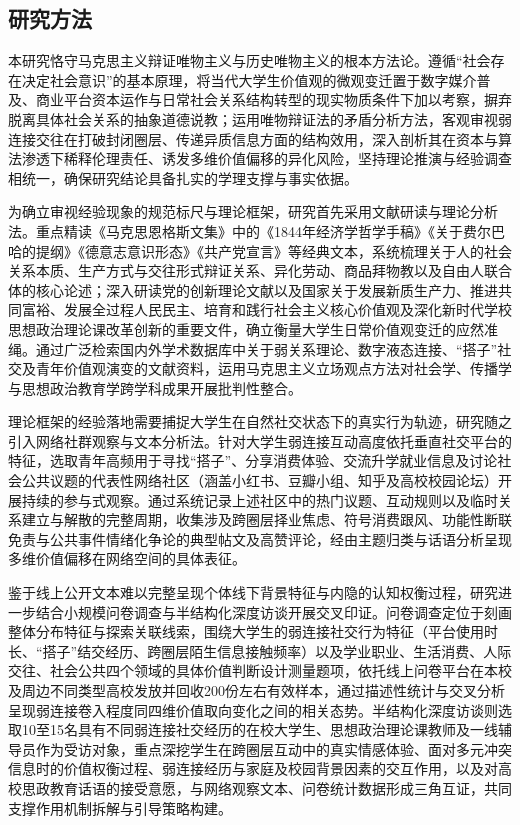 \subsection{研究方法}

本研究恪守马克思主义辩证唯物主义与历史唯物主义的根本方法论。遵循“社会存在决定社会意识”的基本原理，将当代大学生价值观的微观变迁置于数字媒介普及、商业平台资本运作与日常社会关系结构转型的现实物质条件下加以考察，摒弃脱离具体社会关系的抽象道德说教；运用唯物辩证法的矛盾分析方法，客观审视弱连接交往在打破封闭圈层、传递异质信息方面的结构效用，深入剖析其在资本与算法渗透下稀释伦理责任、诱发多维价值偏移的异化风险，坚持理论推演与经验调查相统一，确保研究结论具备扎实的学理支撑与事实依据。

为确立审视经验现象的规范标尺与理论框架，研究首先采用文献研读与理论分析法。重点精读《马克思恩格斯文集》中的《1844年经济学哲学手稿》《关于费尔巴哈的提纲》《德意志意识形态》《共产党宣言》等经典文本，系统梳理关于人的社会关系本质、生产方式与交往形式辩证关系、异化劳动、商品拜物教以及自由人联合体的核心论述；深入研读党的创新理论文献以及国家关于发展新质生产力、推进共同富裕、发展全过程人民民主、培育和践行社会主义核心价值观及深化新时代学校思想政治理论课改革创新的重要文件，确立衡量大学生日常价值观变迁的应然准绳。通过广泛检索国内外学术数据库中关于弱关系理论、数字液态连接、“搭子”社交及青年价值观演变的文献资料，运用马克思主义立场观点方法对社会学、传播学与思想政治教育学跨学科成果开展批判性整合。

理论框架的经验落地需要捕捉大学生在自然社交状态下的真实行为轨迹，研究随之引入网络社群观察与文本分析法。针对大学生弱连接互动高度依托垂直社交平台的特征，选取青年高频用于寻找“搭子”、分享消费体验、交流升学就业信息及讨论社会公共议题的代表性网络社区（涵盖小红书、豆瓣小组、知乎及高校校园论坛）开展持续的参与式观察。通过系统记录上述社区中的热门议题、互动规则以及临时关系建立与解散的完整周期，收集涉及跨圈层择业焦虑、符号消费跟风、功能性断联免责与公共事件情绪化争论的典型帖文及高赞评论，经由主题归类与话语分析呈现多维价值偏移在网络空间的具体表征。

鉴于线上公开文本难以完整呈现个体线下背景特征与内隐的认知权衡过程，研究进一步结合小规模问卷调查与半结构化深度访谈开展交叉印证。问卷调查定位于刻画整体分布特征与探索关联线索，围绕大学生的弱连接社交行为特征（平台使用时长、“搭子”结交经历、跨圈层陌生信息接触频率）以及学业职业、生活消费、人际交往、社会公共四个领域的具体价值判断设计测量题项，依托线上问卷平台在本校及周边不同类型高校发放并回收200份左右有效样本，通过描述性统计与交叉分析呈现弱连接卷入程度同四维价值取向变化之间的相关态势。半结构化深度访谈则选取10至15名具有不同弱连接社交经历的在校大学生、思想政治理论课教师及一线辅导员作为受访对象，重点深挖学生在跨圈层互动中的真实情感体验、面对多元冲突信息时的价值权衡过程、弱连接经历与家庭及校园背景因素的交互作用，以及对高校思政教育话语的接受意愿，与网络观察文本、问卷统计数据形成三角互证，共同支撑作用机制拆解与引导策略构建。

